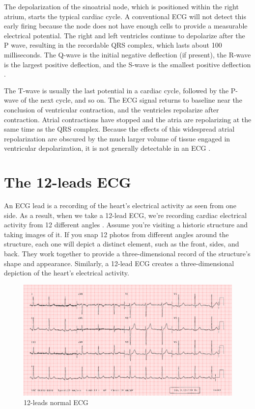  The depolarization of the sinoatrial node, which is positioned within the right atrium, starts the typical cardiac cycle. A conventional ECG will not detect this early firing because the node does not have enough cells to provide a measurable electrical potential. The right and left ventricles continue to depolarize after the P wave, resulting in the recordable QRS complex, which lasts about 100 milliseconds. The Q-wave is the initial negative deflection (if present), the R-wave is the largest positive deflection, and the S-wave is the smallest positive deflection \cite{ecg3}.
 
 
 The T-wave is usually the last potential in a cardiac cycle, followed by the P-wave of the next cycle, and so on. The ECG signal returns to baseline near the conclusion of ventricular contraction, and the ventricles repolarize after contraction. Atrial contractions have stopped and the atria are repolarizing at the same time as the QRS complex. Because the effects of this widespread atrial repolarization are obscured by the much larger volume of tissue engaged in ventricular depolarization, it is not generally detectable in an ECG \cite{ecg1}. 
 
 
\section{The 12-leads ECG} \label{12_lead_ecg}

An ECG lead is a recording of the heart's electrical activity as seen from one side. As a result, when we take a 12-lead ECG, we're recording cardiac electrical activity from 12 different angles \cite{ecg3}. Assume you're visiting a historic structure and taking images of it. If you snap 12 photos from different angles around the structure, each one will depict a distinct element, such as the front, sides, and back. They work together to provide a three-dimensional record of the structure's shape and appearance. Similarly, a 12-lead ECG creates a three-dimensional depiction of the heart's electrical activity.

\begin{figure}[H]
\centering
\includegraphics[scale=0.23]{img/normal_ecg.png}
\caption{12-leads normal ECG}
\label{fig:normal_ecg}
\end{figure}

